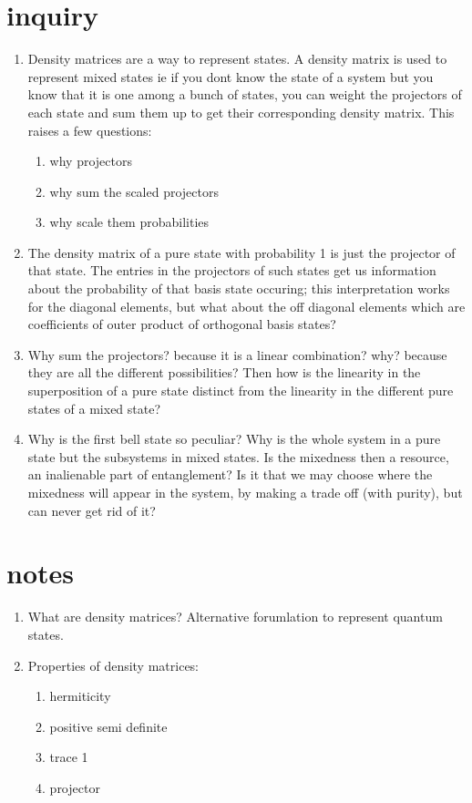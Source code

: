 \documentclass[a4paper,12pt]{amsbook}
\newcommand{\0}{{$|0\rangle$}}
\newcommand{\1}{{$|1\rangle$}}
\begin{document}
\section{inquiry}

\begin{enumerate}
\item Density matrices are a way to represent states. A density matrix is used to represent mixed states ie if you dont know the state of a system but you know that it is one among a bunch of states, you can weight the projectors of each state and sum them up to get their corresponding density matrix. This raises a few questions: \begin{enumerate} \item why projectors \item why sum the scaled projectors \item why scale them probabilities \end{enumerate} 
\item The density matrix of a pure state with probability 1 is just the projector of that state. The entries in the projectors of such states get us information about the probability of that basis state occuring; this interpretation works for the diagonal elements, but what about the off diagonal elements which are coefficients of outer product of orthogonal basis states?
\item Why sum the projectors? because it is a linear combination? why? because they are all the different possibilities? Then how is the linearity in the superposition of a pure state distinct from the linearity in the different pure states of a mixed state?
    \item Why is the first bell state so peculiar? Why is the whole system in a pure state but the subsystems in mixed states. Is the mixedness then a resource, an inalienable part of entanglement? Is it that we may choose where the mixedness will appear in the system, by making a trade off (with purity), but can never get rid of it? 
\end{enumerate}

\section{notes}
\begin{enumerate}
    \item What are density matrices? Alternative forumlation to represent quantum states.
    \item Properties of density matrices:\begin{enumerate} \item hermiticity \item positive semi definite \item trace 1 \item projector \end{enumerate}
\end{enumerate}
\end{document}

